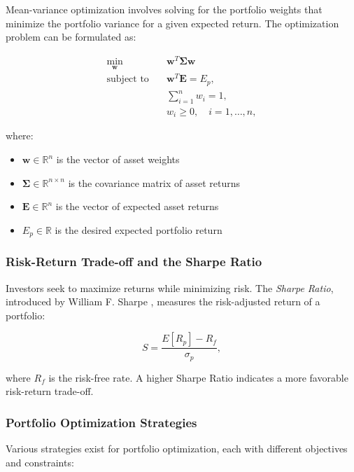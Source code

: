 Mean-variance optimization involves solving for the portfolio weights that minimize the portfolio variance for a given expected return. The optimization problem can be formulated as:

\begin{equation}
\begin{aligned}
    \min_{\mathbf{w}} \quad & \mathbf{w}^T \boldsymbol{\Sigma} \mathbf{w} \\[1ex]
    \text{subject to} \quad & \mathbf{w}^T \mathbf{E} = E_p, \\[1ex]
    & \sum_{i=1}^{n} w_i = 1, \\[1ex]
    & w_i \geq 0, \quad i = 1,\ldots,n,
\end{aligned}
\end{equation}

where:
\begin{itemize}
    \item $\mathbf{w} \in \mathbb{R}^n$ is the vector of asset weights
    \item $\boldsymbol{\Sigma} \in \mathbb{R}^{n \times n}$ is the covariance matrix of asset returns
    \item $\mathbf{E} \in \mathbb{R}^n$ is the vector of expected asset returns
    \item $E_p \in \mathbb{R}$ is the desired expected portfolio return
\end{itemize}
\subsubsection{Risk-Return Trade-off and the Sharpe Ratio}

Investors seek to maximize returns while minimizing risk. The \textit{Sharpe Ratio}, introduced by William F. Sharpe \cite{sharpe1966mutual}, measures the risk-adjusted return of a portfolio:

\begin{equation}
    S = \frac{E[R_p] - R_f}{\sigma_p},
\end{equation}

where $R_f$ is the risk-free rate. A higher Sharpe Ratio indicates a more favorable risk-return trade-off.

\subsubsection{Portfolio Optimization Strategies}

Various strategies exist for portfolio optimization, each with different objectives and constraints:

